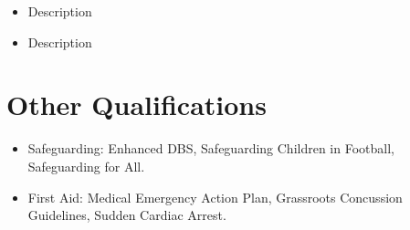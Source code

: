 \begin{itemize}
    \item Description
    \item Description
\end{itemize}

\section*{Other Qualifications}

\begin{itemize}
    \item Safeguarding: Enhanced DBS, Safeguarding Children in Football, Safeguarding for All.
    \item First Aid: Medical Emergency Action Plan, Grassroots Concussion Guidelines, Sudden Cardiac Arrest.
\end{itemize}